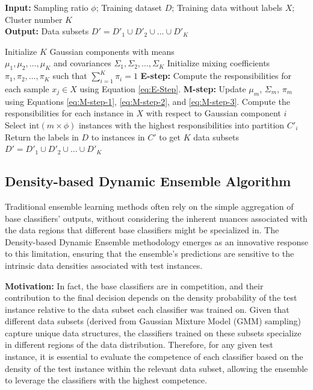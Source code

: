\documentclass[lettersize,journal]{IEEEtran}
\begin{document}
	\begin{algorithm}[!t]
		\caption{GMM Sampling}
		\label{algo:gmm}
		\textbf{Input:} Sampling ratio $\phi$; Training dataset $D$; Training data without labels $X$; Cluster number $K$ \\
		\textbf{Output:} Data subsets $D' = D'_1 \cup D'_2 \cup \dots \cup D'_K$
		\begin{algorithmic}[1]
			\State Initialize $K$ Gaussian components with means \\
			$\mu_1, \mu_2, \dots, \mu_K$ and covariances $\Sigma_1, \Sigma_2, \dots, \Sigma_K$
			\State Initialize mixing coefficients $\pi_1, \pi_2, \dots, \pi_K$ such that $\sum_{i=1}^{K} \pi_i = 1$
			\Repeat
			\State \textbf{E-step:} Compute the responsibilities for each sample $x_j \in X$ using Equation \ref{eq:E-Step}.
			\State \textbf{M-step:} Update $\mu_m$, $\Sigma_m$, $\pi_m$ using Equations \ref{eq:M-step-1}, \ref{eq:M-step-2}, and \ref{eq:M-step-3}.
			\State Compute the responsibilities for each instance in $X$ with respect to Gaussian component $i$
			\State Select $\text{int}(m \times \phi)$ instances with the highest responsibilities into partition $C'_i$
			\EndFor
			\State Return the labels in $D$ to instances in $C'$ to get $K$ data subsets $D' = D'_1 \cup D'_2 \cup \dots \cup D'_K$
			\EndProcedure
		\end{algorithmic}
	\end{algorithm}
	
	\subsection{Density-based Dynamic Ensemble Algorithm}
	\noindent Traditional ensemble learning methods often rely on the simple aggregation of base classifiers’ outputs, without considering the inherent nuances
	associated with the data regions that different base classifiers might be specialized in. The Density-based Dynamic Ensemble methodology emerges
	as an innovative response to this limitation, ensuring that the ensemble’s
	predictions are sensitive to the intrinsic data densities associated with test
	instances.
	
	\textbf{Motivation:} In fact, the base classifiers are in competition, and their contribution to the final decision depends on the density probability of the test instance relative to the data subset each classifier was trained on. Given that different data subsets (derived from Gaussian Mixture Model (GMM) sampling) capture unique data structures, the classifiers trained on these subsets specialize in different regions of the data distribution. Therefore, for any given test instance, it is essential to evaluate the competence of each classifier based on the density of the test instance within the relevant data subset, allowing the ensemble to leverage the classifiers with the highest competence.
	
\end{document}
